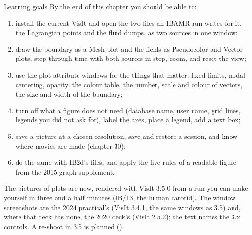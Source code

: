 \documentclass[aspectratio=169,11pt]{beamer}
\begin{document}
\begin{frame}{Learning goals}
\label{fr:goals}
\footnotesize By the end of this chapter you should be able to:
\begin{enumerate}
  \item install the current VisIt and open the two files an IBAMR run writes for it, the Lagrangian points and the fluid dumps, as two sources in one window;
  \item draw the boundary as a Mesh plot and the fields as Pseudocolor and Vector plots, step through time with both sources in step, zoom, and reset the view;
  \item use the plot attribute windows for the things that matter: fixed limits, nodal centering, opacity, the colour table, the number, scale and colour of vectors, the size and width of the boundary;
  \item turn off what a figure does not need (database name, user name, grid lines, legends you did not ask for), label the axes, place a legend, add a text box;
  \item save a picture at a chosen resolution, save and restore a session, and know where movies are made (chapter 30);
  \item do the same with IB2d's  files, and apply the five rules of a readable figure from the 2015 graph supplement.
\end{enumerate}
\begin{punchbox}
\scriptsize The pictures of plots are new, rendered with VisIt 3.5.0 from a run you can make yourself in three and a half minutes (IB/13, the human carotid). The window screenshots are the 2024 practical's (VisIt 3.4.1, the same windows as 3.5) and, where that deck has none, the 2020 deck's (VisIt 2.5.2); the text names the 3.x controls. A re-shoot in 3.5 is planned ().
\end{punchbox}
\end{frame}
\end{document}
